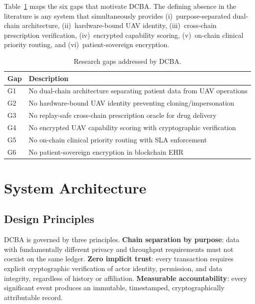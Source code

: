 \documentclass[sigplan,screen]{acmart}
\newcommand{\dcba}{\textsc{DCBA}\xspace}
\begin{document}
Table~\ref{tab:gaps} maps the six gaps that motivate \dcba.
The defining absence in the literature is any system that simultaneously
provides (i)~purpose-separated dual-chain architecture,
(ii)~hardware-bound UAV identity, (iii)~cross-chain prescription
verification, (iv)~encrypted capability scoring, (v)~on-chain clinical
priority routing, and (vi)~patient-sovereign encryption.

\begin{table}[t]
\caption{Research gaps addressed by \dcba.}
\label{tab:gaps}
\small
\begin{tabular}{@{}lp{4.6cm}@{}}
\toprule
\textbf{Gap} & \textbf{Description} \\
\midrule
G1 & No dual-chain architecture separating patient data from UAV operations \\
G2 & No hardware-bound UAV identity preventing cloning/impersonation \\
G3 & No replay-safe cross-chain prescription oracle for drug delivery \\
G4 & No encrypted UAV capability scoring with cryptographic verification \\
G5 & No on-chain clinical priority routing with SLA enforcement \\
G6 & No patient-sovereign encryption in blockchain EHR \\
\bottomrule
\end{tabular}
\end{table}

\section{System Architecture}\label{sec:arch}

\subsection{Design Principles}

\dcba is governed by three principles.
\textbf{Chain separation by purpose}: data with fundamentally different privacy
and throughput requirements must not coexist on the same ledger.
\textbf{Zero implicit trust}: every transaction requires explicit cryptographic
verification of actor identity, permission, and data integrity, regardless of
history or affiliation.
\textbf{Measurable accountability}: every significant event produces an
immutable, timestamped, cryptographically attributable record.
\end{document}

